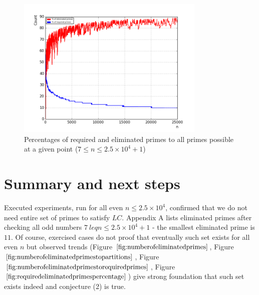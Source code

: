 \documentclass[10pt,twocolumn]{article}
\begin{document}
\begin{figure}[!ht]
\centering
\captionsetup{justification=centering}
\includegraphics[width=9cm]{f_required_eliminated_primes_percentage}
\caption[caption]{Percentages of required and eliminated primes to all primes possible at a given point ($7 \leq n \leq 2.5 \times 10^4 + 1$)}
\label{fig:requiredeliminatedprimespercentage}
\end{figure}

\section{Summary and next steps}

Executed experiments, run for all even $n \leq 2.5 \times 10^4$, confirmed that we do not need entire set of primes to satisfy $LC$. Appendix A lists eliminated primes after checking all odd numbers $7 \ leq n \leq 2.5 \times 10^4 + 1$ - the smallest eliminated prime is $11$. Of course, exercised cases do not proof that eventually such set exists for all even $n$ but observed trends (Figure $\ref{fig:numberofeliminatedprimes}$, Figure $\ref{fig:numberofeliminatedprimestopartitions}$,  Figure $\ref{fig:numberofeliminatedprimestorequiredprimes}$,  Figure $\ref{fig:requiredeliminatedprimespercentage}$) give strong foundation that such set exists indeed and conjecture (2) is true. \par
\end{document}
